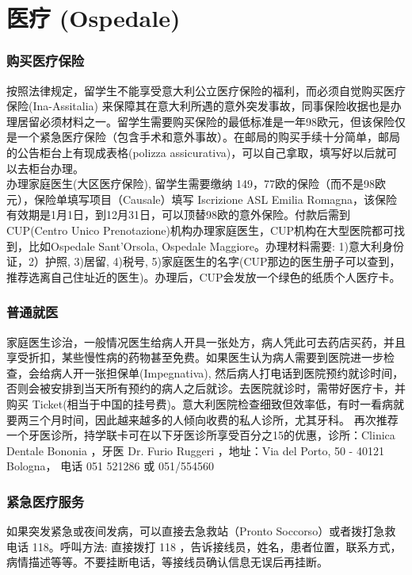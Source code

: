 \section{医疗 (Ospedale)}


\subsubsection{购买医疗保险}

按照法律规定，留学生不能享受意大利公立医疗保险的福利，而必须自觉购买医疗保险(Ina-Assitalia) 来保障其在意大利所遇的意外突发事故，同事保险收据也是办理居留必须材料之一。留学生需要购买保险的最低标准是一年98欧元，但该保险仅是一个紧急医疗保险（包含手术和意外事故）。在邮局的购买手续十分简单，邮局的公告柜台上有现成表格(polizza assicurativa)，可以自己拿取，填写好以后就可以去柜台办理。\\
办理家庭医生(大区医疗保险), 留学生需要缴纳 149，77欧的保险（而不是98欧元），保险单填写项目（Causale）填写 Iscrizione ASL Emilia Romagna，该保险有效期是1月1日，到12月31日，可以顶替98欧的意外保险。付款后需到CUP(Centro Unico Prenotazione)机构办理家庭医生，CUP机构在大型医院都可找到，比如Ospedale Sant'Orsola, Ospedale Maggiore。办理材料需要: 1)意大利身份证，2）护照, 3)居留, 4)税号, 5)家庭医生的名字(CUP那边的医生册子可以查到，推荐选离自己住址近的医生)。办理后，CUP会发放一个绿色的纸质个人医疗卡。

\subsubsection{普通就医}
家庭医生诊治，一般情况医生给病人开具一张处方，病人凭此可去药店买药，并且享受折扣，某些慢性病的药物甚至免费。如果医生认为病人需要到医院进一步检查，会给病人开一张担保单(Impegnativa), 然后病人打电话到医院预约就诊时间，否则会被安排到当天所有预约的病人之后就诊。去医院就诊时，需带好医疗卡，并购买 Ticket(相当于中国的挂号费)。意大利医院检查细致但效率低，有时一看病就要两三个月时间，因此越来越多的人倾向收费的私人诊所，尤其牙科。
再次推荐一个牙医诊所，持学联卡可在以下牙医诊所享受百分之15的优惠，诊所：Clinica Dentale Bononia ，牙医 Dr. Furio Ruggeri ，地址：Via del Porto, 50 - 40121 Bologna， 电话 051 521286 或 051/554560 

\subsubsection{紧急医疗服务}

如果突发紧急或夜间发病，可以直接去急救站（Pronto Soccorso）或者拨打急救电话 118。呼叫方法: 直接拨打 118 ，告诉接线员，姓名，患者位置，联系方式，病情描述等等。不要挂断电话，等接线员确认信息无误后再挂断。

